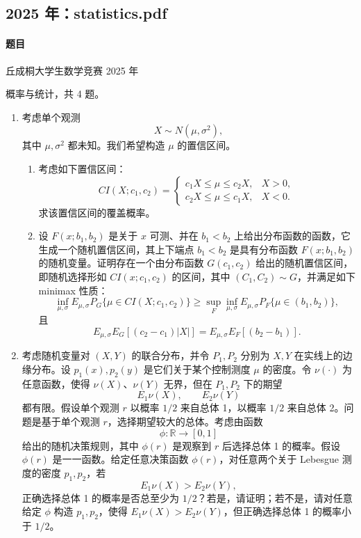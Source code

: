 \documentclass[UTF8,12pt]{ctexart}
\begin{document}
\subsection{2025 年：statistics.pdf}
\paragraph{题目}
丘成桐大学生数学竞赛 2025 年

概率与统计，共 4 题。

\begin{enumerate}[label=\textbf{\arabic*.},leftmargin=2.2em]
\item 考虑单个观测
\[
X\sim N(\mu,\sigma^2),
\]
其中 \(\mu,\sigma^2\) 都未知。我们希望构造 \(\mu\) 的置信区间。
\begin{enumerate}[label=\textbf{\arabic*.},leftmargin=2.4em]
\item 考虑如下置信区间：
\[
CI(X;c_1,c_2)=
\begin{cases}
c_1X\le \mu\le c_2X,& X>0,\\
c_2X\le \mu\le c_1X,& X<0.
\end{cases}
\]
求该置信区间的覆盖概率。
\item 设 \(F(x;b_1,b_2)\) 是关于 \(x\) 可测、并在 \(b_1<b_2\) 上给出分布函数的函数，它生成一个随机置信区间，其上下端点 \(b_1<b_2\) 是具有分布函数 \(F(x;b_1,b_2)\) 的随机变量。证明存在一个由分布函数 \(G(c_1,c_2)\) 给出的随机置信区间，即随机选择形如 \(CI(x;c_1,c_2)\) 的区间，其中 \((C_1,C_2)\sim G\)，并满足如下 minimax 性质：
\[
\inf_{\mu,\sigma}E_{\mu,\sigma}P_G\{\mu\in CI(X;c_1,c_2)\}
\ge
\sup_F\inf_{\mu,\sigma}E_{\mu,\sigma}P_F\{\mu\in(b_1,b_2)\},
\]
且
\[
E_{\mu,\sigma}E_G[(c_2-c_1)|X|]
=E_{\mu,\sigma}E_F[(b_2-b_1)].
\]
\end{enumerate}

\item 考虑随机变量对 \((X,Y)\) 的联合分布，并令 \(P_1,P_2\) 分别为 \(X,Y\) 在实线上的边缘分布。设 \(p_1(x),p_2(y)\) 是它们关于某个控制测度 \(\mu\) 的密度。令 \(\nu(\cdot)\) 为任意函数，使得 \(\nu(X)\)、\(\nu(Y)\) 无界，但在 \(P_1,P_2\) 下的期望
\[
E_1\nu(X),\qquad E_2\nu(Y)
\]
都有限。假设单个观测 \(r\) 以概率 \(1/2\) 来自总体 1，以概率 \(1/2\) 来自总体 2。问题是基于单个观测 \(r\)，选择期望较大的总体。考虑由函数
\[
\phi:\mathbb R\to[0,1]
\]
给出的随机决策规则，其中 \(\phi(r)\) 是观察到 \(r\) 后选择总体 1 的概率。假设 \(\phi(r)\) 是一一函数。给定任意决策函数 \(\phi(r)\)，对任意两个关于 Lebesgue 测度的密度 \(p_1,p_2\)，若
\[
E_1\nu(X)>E_2\nu(Y),
\]
正确选择总体 1 的概率是否总至少为 \(1/2\)？若是，请证明；若不是，请对任意给定 \(\phi\) 构造 \(p_1,p_2\)，使得 \(E_1\nu(X)>E_2\nu(Y)\)，但正确选择总体 1 的概率小于 \(1/2\)。


\end{enumerate}
\end{document}
